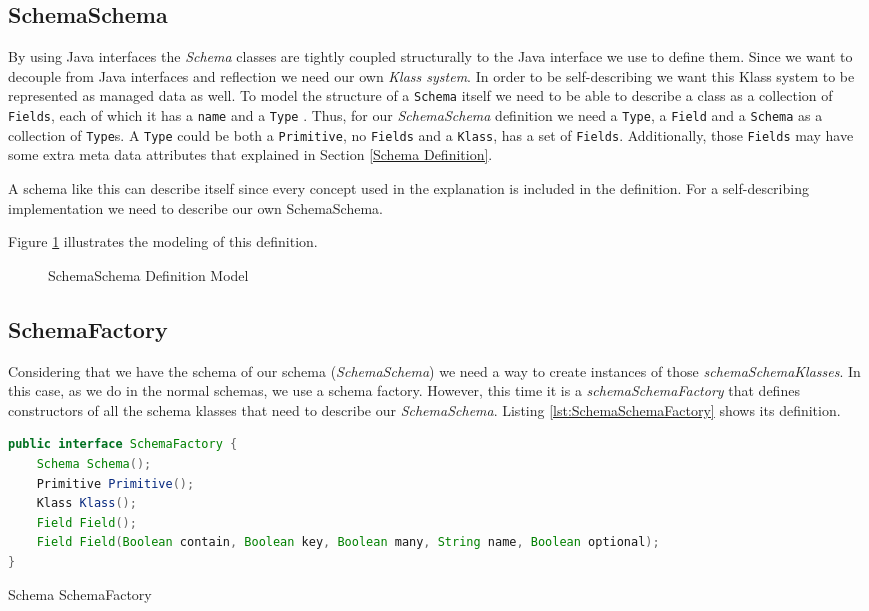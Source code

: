 \subsection{SchemaSchema}\label{sec:SchemaSchema}
By using Java interfaces the \textit{Schema} classes are tightly coupled structurally to the Java interface we use to define them.
Since we want to decouple from Java interfaces and reflection we need our own \textit{Klass system}.
In order to be self-describing we want this Klass system to be represented as managed data as well. 
To model the structure of a \texttt{Schema} itself we need to be able to describe a class as a collection of \texttt{Fields}, each of which it has a \texttt{name} and a \texttt{Type} \cite{loh2012managed}. 
Thus, for our \textit{SchemaSchema} definition we need a \texttt{Type}, a \texttt{Field} and a \texttt{Schema} as a collection of \texttt{Type}s. 
A \texttt{Type} could be both a \texttt{Primitive}, no \texttt{Fields} and a \texttt{Klass}, has a set of \texttt{Fields}.
Additionally, those \texttt{Fields} may have some extra meta data attributes that explained in Section \ref{Schema Definition}.

A schema like this can describe itself since every concept used in the explanation is included in the definition.
For a self-describing implementation we need to describe our own SchemaSchema. 

Figure \ref{fig:SchemaSchema_definition} illustrates the modeling of this definition.

\begin{figure}[H]
	\centering
  	\caption{SchemaSchema Definition Model}
  	\label{fig:SchemaSchema_definition}
\end{figure}

\subsection{SchemaFactory}\label{sec:SchemaFactory}
Considering that we have the schema of our schema (\textit{SchemaSchema}) we need a way to create instances of those \textit{schemaSchemaKlasses}.
In this case, as we do in the normal schemas, we use a schema factory. 
However, this time it is a \textit{schemaSchemaFactory} that defines constructors of all the schema klasses that need to describe our \textit{SchemaSchema}.
Listing \ref{lst:SchemaSchemaFactory} shows its definition.

\begin{sourcecode} [H]
	\begin{lstlisting}[language=Java, escapechar=|]
public interface SchemaFactory {
    Schema Schema();
    Primitive Primitive();
    Klass Klass();
    Field Field();
    Field Field(Boolean contain, Boolean key, Boolean many, String name, Boolean optional);
}
	\end{lstlisting}
	\caption{Schema SchemaFactory}
	\label{lst:SchemaSchemaFactory}
\end{sourcecode}

